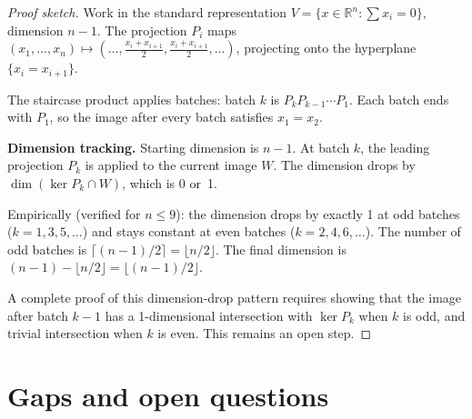 \documentclass[11pt]{article}
\theoremstyle{definition}
\theoremstyle{remark}
\begin{document}
\begin{proof}[Proof sketch]
Work in the standard representation $V = \{x \in \mathbb{R}^n : \sum x_i = 0\}$,
dimension $n{-}1$.
The projection $P_i$ maps $(x_1, \dots, x_n) \mapsto (\dots, \frac{x_i+x_{i+1}}{2},
\frac{x_i+x_{i+1}}{2}, \dots)$, projecting onto the hyperplane $\{x_i = x_{i+1}\}$.

The staircase product applies batches: batch $k$ is $P_k P_{k-1} \cdots P_1$.
Each batch ends with $P_1$, so the image after every batch satisfies $x_1 = x_2$.

\textbf{Dimension tracking.}
Starting dimension is $n{-}1$.
At batch $k$, the leading projection $P_k$ is applied to the current image $W$.
The dimension drops by $\dim(\ker P_k \cap W)$, which is 0 or~1.

Empirically (verified for $n \le 9$): the dimension drops by exactly 1 at odd
batches ($k = 1, 3, 5, \dots$) and stays constant at even batches ($k = 2, 4, 6, \dots$).
The number of odd batches is $\lceil(n{-}1)/2\rceil = \lfloor n/2 \rfloor$.
The final dimension is $(n{-}1) - \lfloor n/2 \rfloor = \lfloor(n{-}1)/2\rfloor$.

A complete proof of this dimension-drop pattern requires showing that the image
after batch $k{-}1$ has a 1-dimensional intersection with $\ker P_k$ when $k$ is odd,
and trivial intersection when $k$ is even.
This remains an open step. \qedhere
\end{proof}


\section{Gaps and open questions}
\end{document}
